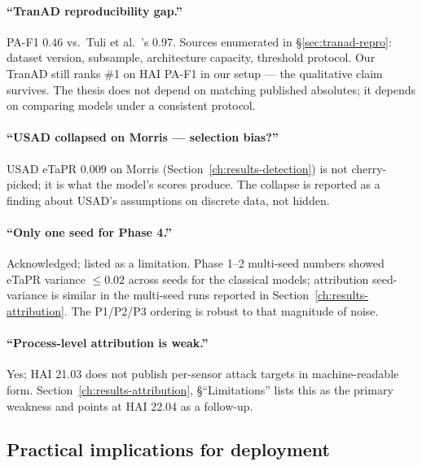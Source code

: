 \paragraph{``TranAD reproducibility gap.''}
PA-F1 $0.46$ vs.\ Tuli et al.~\cite{tuli2022tranad}'s $0.97$.  Sources enumerated in \S\ref{sec:tranad-repro}: dataset version, subsample, architecture capacity, threshold protocol.  Our TranAD still ranks \#1 on HAI PA-F1 in our setup --- the qualitative claim survives.  The thesis does not depend on matching published absolutes; it depends on comparing models under a consistent protocol.

\paragraph{``USAD collapsed on Morris --- selection bias?''}
USAD eTaPR $0.009$ on Morris (Section~\ref{ch:results-detection}) is not cherry-picked; it is what the model's scores produce.  The collapse is reported as a finding about USAD's assumptions on discrete data, not hidden.

\paragraph{``Only one seed for Phase 4.''}
Acknowledged; listed as a limitation.  Phase 1--2 multi-seed numbers showed eTaPR variance $\leq 0.02$ across seeds for the classical models; attribution seed-variance is similar in the multi-seed runs reported in Section~\ref{ch:results-attribution}.  The P1/P2/P3 ordering is robust to that magnitude of noise.

\paragraph{``Process-level attribution is weak.''}
Yes; HAI 21.03 does not publish per-sensor attack targets in machine-readable form.  Section~\ref{ch:results-attribution}, \S``Limitations'' lists this as the primary weakness and points at HAI 22.04 as a follow-up.

\subsection{Practical implications for deployment}

